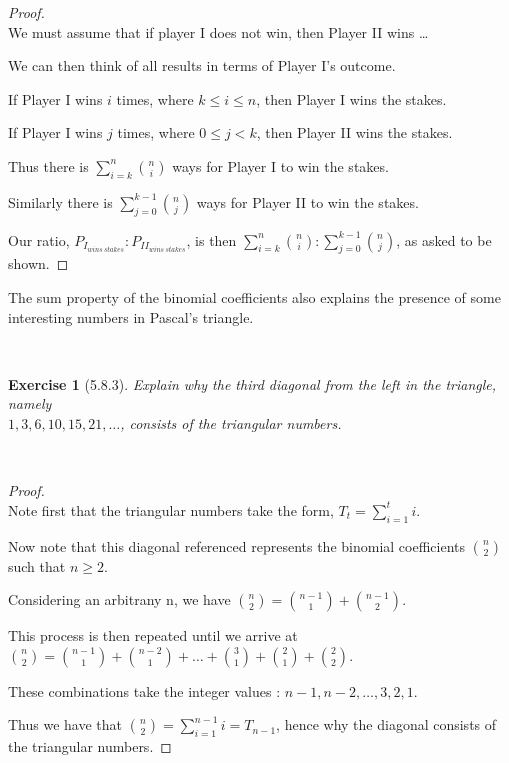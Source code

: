 \documentclass[12pt]{article}
\newcommand{\XB}{\color{black}}
\newcommand{\XBB}{\color{blue}}
\newcommand{\ds}{\displaystyle}
\theoremstyle{plain}
\newtheorem{ex}{Exercise}
\begin{document}
\begin{proof}
  \ \\

  We must assume that if player I does not win, then Player II wins \dots

  We can then think of all results in terms of Player I's outcome.

  If Player I wins $ i $ times, where $ k \le i \le n $, then Player I wins the stakes.

  If Player I wins $ j $ times, where $ 0 \le j < k $, then Player II wins the stakes.

  Thus there is $ \ds \sum_{i = k}^{n} \binom{n}{i} $ ways for Player I to win the stakes.

  Similarly there is $ \ds \sum_{j = 0}^{k-1} \binom{n}{j} $ ways for Player II to win the stakes.

  Our ratio, $ P_{I_{wins \ stakes}} : P_{II_{wins \ stakes}} $, is then $ \ds \sum_{i = k}^{n} \binom{n}{i} : \sum_{j = 0}^{k-1} \binom{n}{j} $, as asked to be shown.
\end{proof}

\newpage

The sum property of the binomial coefficients also explains the presence of some interesting numbers in Pascal's triangle.


\XBB\hrulefill\XB \\
\begin{ex} [5.8.3]
  Explain why the third diagonal from the left in the triangle, namely \\
  $ 1, 3, 6, 10, 15, 21, \ldots $, consists of the triangular numbers.
\end{ex}
\XBB\hrulefill\XB \\

\begin{proof}
  \ \\

  Note first that the triangular numbers take the form, $ \ds T_{t} = \sum_{i = 1}^{t} i $.

  Now note that this diagonal referenced represents the binomial coefficients $ \ds \binom{n}{2} $ such that $ n \ge 2 $.

  Considering an arbitrany n, we have $ \ds \binom{n}{2} = \binom{n - 1}{1} + \binom{n - 1}{2} $.

  This process is then repeated until we arrive at $ \ds \binom{n}{2} = \binom{n - 1}{1} + \binom{n - 2}{1} + \dots + \binom{3}{1} + \binom{2}{1} + \binom{2}{2} $.

  These combinations take the integer values : $ n - 1, n - 2, \dots, 3, 2, 1 $.

  Thus we have that $ \ds \binom{n}{2} = \sum_{i = 1}^{n - 1} i = T_{n - 1} $, hence why the diagonal consists of the triangular numbers.
\end{proof}
\end{document}
